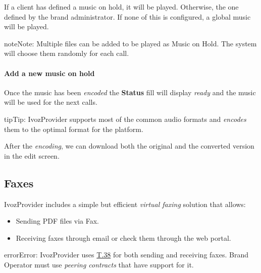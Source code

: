 \documentclass[letterpaper,10pt,english]{sphinxmanual}
\begin{document}
If a client has defined a music on hold, it will be played. Otherwise, the
one defined by the brand administrator. If none of this is configured, a global
music will be played.

\begin{notice}{note}{Note:}
Multiple files can be added to be played as Music on Hold. The system
will choose them randomly for each call.
\end{notice}
\paragraph{Add a new music on hold}

Once the music has been \emph{encoded} the \textbf{Status} fill will display \emph{ready} and
the music will be used for the next calls.

\begin{notice}{tip}{Tip:}
IvozProvider supports most of the common audio formats and \emph{encodes}
them to the optimal format for the platform.
\end{notice}

After the \emph{encoding}, we can download both the original and the converted
version in the edit screen.
\label{administration_portal/client/vpbx/faxes:faxing-system}

\subsection{Faxes}
\label{administration_portal/client/vpbx/faxes:faxes}\label{administration_portal/client/vpbx/faxes::doc}\label{administration_portal/client/vpbx/faxes:faxing-system}\label{administration_portal/client/vpbx/faxes:id1}
IvozProvider includes a simple but efficient \emph{virtual faxing} solution that allows:
\begin{itemize}
\item {} 
Sending PDF files via Fax.

\item {} 
Receiving faxes through email or check them through the web portal.

\end{itemize}

\begin{notice}{error}{Error:}
IvozProvider uses
\href{http://www.voip-info.org/wiki/view/T.38}{T.38} for both sending and receiving
faxes. Brand Operator must use \emph{peering contracts} that have support for it.
\end{notice}
\end{document}
